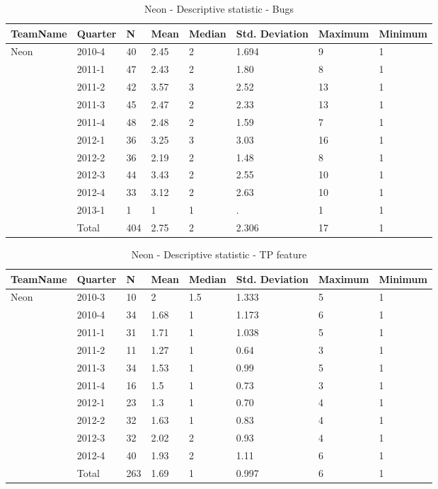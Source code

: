 \documentclass[UKenglish]{ifimaster}  %
\begin{document}
\begin{table}[!htbp]
\begin{tabular}{ | l | l | l | l | l | l | l | l | }
\hline
	TeamName & Quarter & N & Mean & Median & Std. Deviation & Maximum & Minimum \\ \hline
	Neon & 2010-4 & 40 & 2.45& 2 & 1.694 & 9 & 1 \\ \hline
	 & 2011-1 & 47 & 2.43 & 2 & 1.80& 8 & 1 \\ \hline
	 & 2011-2 & 42 & 3.57 & 3 & 2.52 & 13 & 1 \\ \hline
	&2011-3 & 45 & 2.47 & 2 & 2.33 & 13 & 1  \  \\ \hline
	 & 2011-4 & 48 & 2.48 & 2 & 1.59 & 7 & 1 \\ \hline
	 & 2012-1 & 36 & 3.25 & 3 & 3.03& 16 & 1 \\ \hline
	 & 2012-2 & 36 & 2.19 & 2 & 1.48 & 8 & 1 \\ \hline
	 & 2012-3 & 44 & 3.43 & 2 & 2.55 & 10 & 1 \\ \hline
	 & 2012-4 & 33 & 3.12 & 2 & 2.63& 10 & 1 \\ \hline
	 & 2013-1 & 1 & 1 & 1 & . & 1 & 1 \\ \hline
	 & Total & 404 & 2.75 & 2 & 2.306 & 17 & 1 \\ \hline
\end{tabular}
\caption{Neon - Descriptive statistic - Bugs}
\end{table}

\begin{table}[!htbp]
\begin{tabular}{ | l | l | l | l | l | l | l | l | }
\hline
	TeamName & Quarter & N & Mean & Median & Std. Deviation & Maximum & Minimum \\ \hline
	Neon & 2010-3 & 10 & 2 & 1.5 & 1.333 & 5 & 1 \\ \hline
	 & 2010-4 & 34 & 1.68 & 1 & 1.173 & 6 & 1 \\ \hline
	 & 2011-1 & 31 & 1.71 & 1 & 1.038 & 5 & 1 \\ \hline
	 & 2011-2 & 11 & 1.27 & 1 & 0.64 & 3 & 1 \\ \hline
	 & 2011-3 & 34 & 1.53 & 1 & 0.99 & 5 & 1 \\ \hline
	 & 2011-4 & 16 & 1.5 & 1 & 0.73 & 3 & 1 \\ \hline
	 & 2012-1 & 23 & 1.3 & 1 & 0.70 & 4 & 1 \\ \hline
	 & 2012-2 & 32 & 1.63 & 1 & 0.83 & 4 & 1 \\ \hline
	 & 2012-3 & 32 & 2.02& 2 & 0.93 & 4 & 1 \\ \hline
	 & 2012-4 & 40 & 1.93 & 2 & 1.11 & 6 & 1 \\ \hline
	 & Total & 263 & 1.69 & 1 & 0.997 & 6 & 1 \\ \hline
\end{tabular}
\caption{Neon - Descriptive statistic - TP feature}
\end{table}
\end{document}
